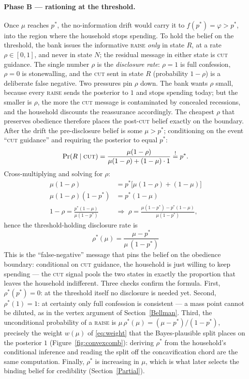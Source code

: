\documentclass[12pt]{article}
\begin{document}
\paragraph{Phase B --- rationing at the threshold.} Once $\mu$ reaches $p^*$, the no-information drift would carry it to $f(p^*) = \varphi > p^*$, into the region where the household stops spending. To hold the belief on the threshold, the bank issues the informative \textsc{raise} \emph{only} in state $R$, at a rate $\rho \in [0,1]$, and never in state $N$; the residual message in either state is \textsc{cut} guidance. The single number $\rho$ is the \emph{disclosure rate}: $\rho=1$ is full confession, $\rho=0$ is stonewalling, and the \textsc{cut} sent in state $R$ (probability $1-\rho$) is a deliberate false negative. Two pressures pin $\rho$ down. The bank wants $\rho$ small, because every \textsc{raise} sends the posterior to $1$ and stops spending today; but the smaller is $\rho$, the more the \textsc{cut} message is contaminated by concealed recessions, and the household discounts the reassurance accordingly. The cheapest $\rho$ that preserves obedience therefore places the post-\textsc{cut} belief exactly on the boundary. After the drift the pre-disclosure belief is some $\mu > p^*$; conditioning on the event ``\textsc{cut} guidance'' and requiring the posterior to equal $p^*$:
\[
\Pr(R \mid \textsc{cut}) = \frac{\mu(1-\rho)}{\mu(1-\rho) + (1-\mu)\cdot 1} \stackrel{!}{=} p^* .
\]
Cross-multiplying and solving for $\rho$:
\begin{align*}
\mu(1-\rho) &= p^*\big[\mu(1-\rho) + (1-\mu)\big]\\
\mu(1-\rho)(1-p^*) &= p^*(1-\mu)\\
1-\rho = \frac{p^*(1-\mu)}{\mu(1-p^*)}
\;&\Longrightarrow\;
\rho = \frac{\mu(1-p^*) - p^*(1-\mu)}{\mu(1-p^*)} ,
\end{align*}
hence the threshold-holding disclosure rate is
\begin{equation}\label{eq:rhostar}
\boxed{\;\rho^*(\mu) = \frac{\mu - p^*}{\mu\,(1-p^*)}\;}
\end{equation}
This is the ``false-negative'' message that pins the belief on the obedience boundary: conditional on \textsc{cut} guidance, the household is just willing to keep spending --- the \textsc{cut} signal pools the two states in exactly the proportion that leaves the household indifferent. Three checks confirm the formula. First, $\rho^*(p^*)=0$: at the threshold itself no disclosure is needed yet. Second, $\rho^*(1)=1$: at certainty only full confession is consistent --- a mass point cannot be diluted, as in the vertex argument of Section~\ref{Bellman}. Third, the unconditional probability of a \textsc{raise} is $\mu\,\rho^*(\mu) = (\mu-p^*)/(1-p^*)$, precisely the weight $w(\mu)$ of \eqref{eq:weight} that the Bayes-plausible split places on the posterior $1$ (Figure~\ref{fig:convexcomb}): deriving $\rho^*$ from the household's conditional inference and reading the split off the concavification chord are the same computation. Finally, $\rho^*$ is increasing in $\mu$, which is what later selects the binding belief for credibility (Section~\ref{Partial}).
\end{document}
